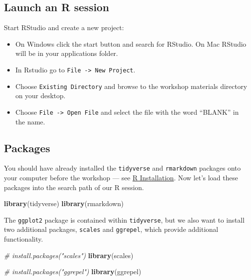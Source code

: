 \documentclass[]{book}
\newenvironment{Shaded}{\begin{snugshade}}{\end{snugshade}}
\newcommand{\CommentTok}[1]{\textcolor[rgb]{0.56,0.35,0.01}{\textit{#1}}}
\newcommand{\KeywordTok}[1]{\textcolor[rgb]{0.13,0.29,0.53}{\textbf{#1}}}
\newcommand{\NormalTok}[1]{#1}
\providecommand{\tightlist}{%
  \setlength{\itemsep}{0pt}\setlength{\parskip}{0pt}}
\begin{document}
\hypertarget{launch-an-r-session-1}{%
\subsection{Launch an R session}\label{launch-an-r-session-1}}

Start RStudio and create a new project:

\begin{itemize}
\tightlist
\item
  On Windows click the start button and search for RStudio. On Mac
  RStudio will be in your applications folder.
\item
  In Rstudio go to \texttt{File\ -\textgreater{}\ New\ Project}.
\item
  Choose \texttt{Existing\ Directory} and browse to the workshop materials directory on your desktop.
\item
  Choose \texttt{File\ -\textgreater{}\ Open\ File} and select the file with the word ``BLANK'' in the name.
\end{itemize}

\hypertarget{packages-1}{%
\subsection{Packages}\label{packages-1}}

You should have already installed the \texttt{tidyverse} and \texttt{rmarkdown}
packages onto your computer before the workshop
--- see \href{./Rinstall.html}{R Installation}.
Now let's load these packages into the search path of our R session.

\begin{Shaded}
\begin{Highlighting}[]
\KeywordTok{library}\NormalTok{(tidyverse)}
\KeywordTok{library}\NormalTok{(rmarkdown)}
\end{Highlighting}
\end{Shaded}

The \texttt{ggplot2} package is contained within \texttt{tidyverse}, but we also want to
install two additional packages, \texttt{scales} and \texttt{ggrepel}, which provide
additional functionality.

\begin{Shaded}
\begin{Highlighting}[]
\CommentTok{# install.packages("scales")}
\KeywordTok{library}\NormalTok{(scales)}

\CommentTok{# install.packages("ggrepel") }
\KeywordTok{library}\NormalTok{(ggrepel)}
\end{Highlighting}
\end{Shaded}
\end{document}
